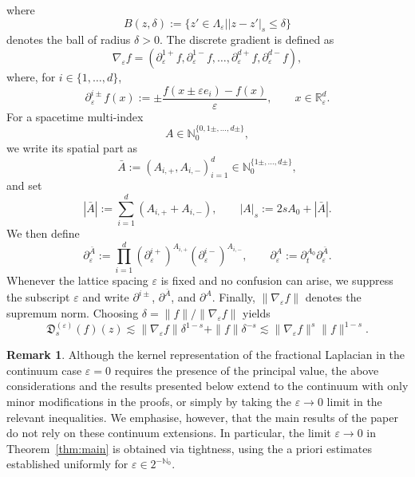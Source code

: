 \documentclass{article}
\numberwithin{equation}{section}
\newcommand{\assign}{:=}
\theoremstyle{plain}
\theoremstyle{definition}
\newtheorem{remark}[theorem]{Remark}
\begin{document}
where
\[ B (z, \delta) \assign \{ z' \in \Lambda_{\varepsilon} |  | z - z' |_s
   \leqslant \delta \} \]
denotes the ball of radius $\delta > 0$. The discrete gradient is defined as
\[ \nabla_{\varepsilon} f = (\partial^{1+}_\varepsilon f,
   \partial^{1-}_\varepsilon f, \ldots,
   \partial^{d+}_\varepsilon f, \partial^{d-}_\varepsilon f), \]
where, for \(i \in \{1, \ldots, d\}\),
\[
  \partial^{i\pm}_\varepsilon f (x)
  \assign
  \pm \frac{f (x \pm \varepsilon e_i) - f (x)}{\varepsilon},
  \qquad x \in \mathbb{R}^d_\varepsilon .
\]
For a spacetime multi-index
\[
  A \in \mathbb{N}_0^{\{ 0, 1\pm, \ldots, d\pm\}},
\]
we write its spatial part as
\[
  \bar{A} \assign (A_{i,+}, A_{i,-})_{i = 1}^d
  \in \mathbb{N}_0^{\{1\pm, \ldots, d\pm\}},
\]
and set
\[
  |\bar{A}| \assign \sum_{i = 1}^d (A_{i,+} + A_{i,-}),
  \qquad
  |A|_s \assign 2 s A_0 + |\bar{A}|.
\]
We then define
\[
  \partial_\varepsilon^{\bar{A}}
  \assign
  \prod_{i = 1}^d
  (\partial^{i+}_\varepsilon)^{A_{i,+}}
  (\partial^{i-}_\varepsilon)^{A_{i,-}},
  \qquad
  \partial_\varepsilon^A
  \assign
  \partial_t^{A_0}\partial_\varepsilon^{\bar{A}}.
\]
Whenever the lattice spacing \(\varepsilon\) is fixed and no confusion can
arise, we suppress the subscript \(\varepsilon\) and write
\(\partial^{i\pm}\), \(\partial^{\bar{A}}\), and \(\partial^A\). Finally,
\(\| \nabla_{\varepsilon} f \|\) denotes the supremum norm. Choosing
\(\delta = \| f \| / \| \nabla_{\varepsilon} f
\|\) yields
\begin{equation}
  \mathfrak{D}^{(\varepsilon)}_s (f) (z) \lesssim \|
  \nabla_{\varepsilon} f \| \delta^{1 - s} + \| f \| \delta^{- s} \lesssim \|
  \nabla_{\varepsilon} f \|^s  \| f \|^{1 - s} . \label{eq:D-est}
\end{equation}
\begin{remark}
  Although the kernel representation of the fractional Laplacian in the
  continuum case $\varepsilon = 0$ requires the presence of the principal
  value, the above considerations and the results presented below extend to
  the continuum with only minor modifications in the proofs, or simply by
  taking the $\varepsilon \rightarrow 0$ limit in the relevant inequalities.
  We emphasise, however, that the main results of the paper do not rely on
  these continuum extensions. In particular, the limit $\varepsilon
  \rightarrow 0$ in Theorem~\ref{thm:main} is obtained via tightness, using
  the a priori estimates established uniformly for $\varepsilon \in
  2^{-\mathbb{N}_0}$.
\end{remark}
\end{document}
